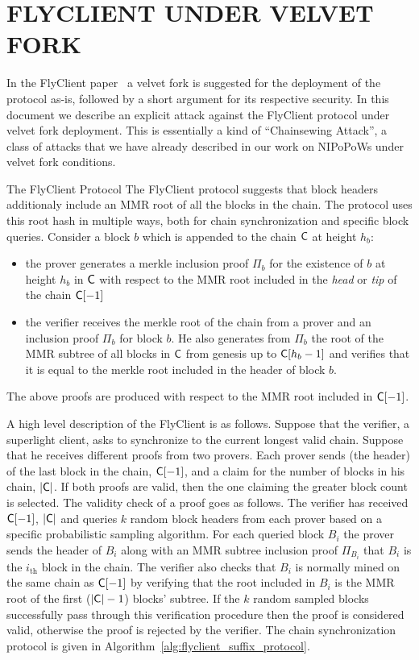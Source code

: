 \chapter{FLYCLIENT UNDER VELVET FORK}
In the FlyClient paper~\cite{flyclient} a velvet fork is suggested for the deployment of the protocol as-is, followed by a short argument for its respective security. In this document we describe an explicit attack against the FlyClient protocol under velvet fork deployment. This is essentially a kind of ``Chainsewing Attack'', a class of attacks that we have already described in our work on NIPoPoWs under velvet fork conditions.

\begin{section}{The FlyClient Protocol}
	The FlyClient protocol suggests that block headers additionaly include an MMR root of all the blocks in the chain. The protocol uses this root hash in multiple ways, both for chain synchronization and specific block queries. Consider a block $b$ which is appended to the chain $\mathsf{C}$ at height $h_b$: 
	\begin{itemize}
		\item the prover generates a merkle inclusion proof $\Pi_b$ for the existence of $b$ at height $h_b$ in $\mathsf{C}$ with respect to the MMR root included in the \emph{head} or \emph{tip} of the chain $\mathsf{C}[-1]$
		\item the verifier receives the merkle root of the chain from a prover and an inclusion proof $\Pi_b$ for block $b$. He also generates from $\Pi_b$ the root of the MMR subtree of all blocks in $\mathsf{C}$ from genesis up to $\mathsf{C}[h_b - 1]$ and verifies that it is equal to the merkle root included in the header of block $b$.
	\end{itemize}
	The above proofs are produced with respect to the MMR root included in $\mathsf{C}[-1]$.

	\vspace{2mm}
	\noindent
	A high level description of the FlyClient is as follows. Suppose that  the verifier, a superlight client, asks to synchronize to the current longest valid chain.  Suppose that he receives different proofs from two provers. Each prover sends (the header) of the last block in the chain, $\mathsf{C}[-1]$, and a claim for the number of blocks in his chain, $\lvert \mathsf{C} \rvert$. If both proofs are valid, then the one claiming the greater block count is selected. The validity check of a proof goes as follows. 
	The verifier has received $\mathsf{C}[-1]$, $\lvert \mathsf{C} \rvert$ and queries $k$ random block headers from each prover based on a specific probabilistic sampling algorithm. For each queried block $B_i$ the prover sends the header of $B_i$ along with an MMR subtree inclusion proof $\Pi_{B_i}$ that $B_i$ is the $i_\text{th}$ block in the chain. The verifier also checks that $B_i$ is normally mined on the same chain as $\mathsf{C}[-1]$ by verifying that the root included in $B_i$ is the MMR root of the first ($\lvert \mathsf{C} \rvert - 1$) blocks' subtree. If the $k$ random sampled blocks successfully pass through this verification procedure then the proof is considered valid, otherwise the proof is rejected by the verifier. 
	The chain synchronization protocol is given in Algorithm~\ref{alg:flyclient_suffix_protocol}.


\end{section}
